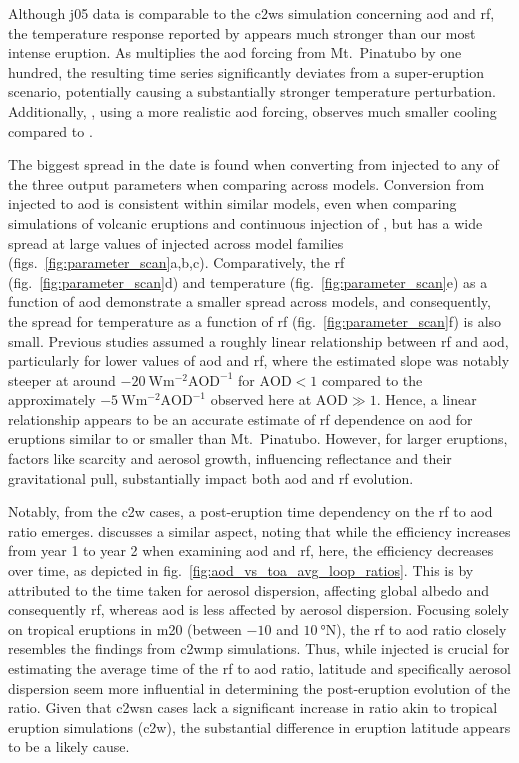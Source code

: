 \documentclass{ametsocV6.1}
\newcommand{\iso}[1][i]{{#1}njected \ce{SO2}}
\begin{document}
Although \gls{j05} data is comparable to the \gls{c2ws} simulation concerning \gls{aod}
and \gls{rf}, the temperature response reported by \citet{jones2005} appears much
stronger than our most intense eruption. As \citet{jones2005} multiplies the \gls{aod}
forcing from Mt.\ Pinatubo by one hundred, the resulting time series significantly
deviates from a super-eruption scenario, potentially causing a substantially stronger
temperature perturbation. Additionally, \citet{timmreck2010}, using a more realistic
\gls{aod} forcing, observes much smaller cooling compared to \citet{jones2005}.

The biggest spread in the date is found when converting from \iso{} to any of the three
output parameters when comparing across models. Conversion from \iso{} to \gls{aod} is
consistent within similar models, even when comparing simulations of volcanic eruptions
\citep{timmreck2010} and continuous injection of  \citep{niemeier2015}, but has
a wide spread at large values of \iso{} across model families
(figs.~\ref{fig:parameter_scan}a,b,c). Comparatively, the \gls{rf}
(fig.~\ref{fig:parameter_scan}d) and temperature (fig.~\ref{fig:parameter_scan}e) as a
function of \gls{aod} demonstrate a smaller spread across models, and consequently, the
spread for temperature as a function of \gls{rf} (fig.~\ref{fig:parameter_scan}f) is
also small. Previous studies assumed a roughly linear relationship between \gls{rf} and
\gls{aod}, particularly for lower values of \gls{aod} and \gls{rf}, where the estimated
slope was notably steeper at around \(\SI{-20}{\watt\metre^{-2}\mathrm{AOD}^{-1}}\) for
\(\mathrm{AOD}<1\) compared to the approximately
\(\SI{-5}{\watt\metre^{-2}\mathrm{AOD}^{-1}}\) observed here at \(\mathrm{AOD}\gg1\).
Hence, a linear relationship appears to be an accurate estimate of \gls{rf} dependence
on \gls{aod} for eruptions similar to or smaller than Mt.\ Pinatubo. However, for larger
eruptions, factors like  scarcity and aerosol growth, influencing reflectance and
their gravitational pull, substantially impact both \gls{aod} and \gls{rf} evolution.

Notably, from the \gls{c2w} cases, a post-eruption time dependency on the \gls{rf} to
\gls{aod} ratio emerges. \citet{marshall2020} discusses a similar aspect, noting that
while the efficiency increases from year 1 to year 2 when examining \gls{aod} and
\gls{rf}, here, the efficiency decreases over time, as depicted in
fig.~\ref{fig:aod_vs_toa_avg_loop_ratios}. This is by \citet{marshall2020} attributed to
the time taken for aerosol dispersion, affecting global albedo and consequently
\gls{rf}, whereas \gls{aod} is less affected by aerosol dispersion. Focusing solely on
tropical eruptions in \gls{m20} (between \(-10\) and \(\SI{10}{\degree\mathrm{N}}\)),
the \gls{rf} to \gls{aod} ratio closely resembles the findings from \gls{c2wmp}
simulations. Thus, while \iso{} is crucial for estimating the average time of the
\gls{rf} to \gls{aod} ratio, latitude and specifically aerosol dispersion seem more
influential in determining the post-eruption evolution of the ratio. Given that
\gls{c2wsn} cases lack a significant increase in ratio akin to tropical eruption
simulations (\gls{c2w}), the substantial difference in eruption latitude appears to be a
likely cause.
\end{document}
